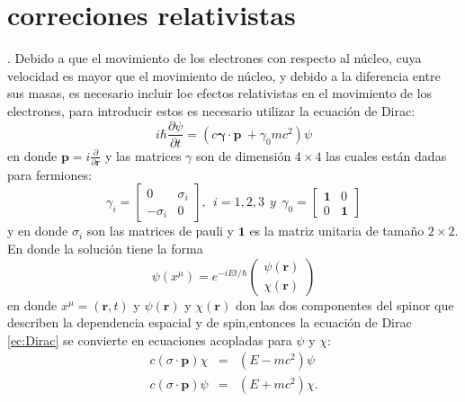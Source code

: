 \documentclass[12pt,a4paper, oneside]{book}
\begin{document}
   \section{correciones relativistas} \label{sec:corrRel}.
   Debido a que el movimiento de los electrones con respecto al n\'ucleo, cuya velocidad es mayor que el movimiento  de n\'ucleo, y debido a la diferencia entre sus masas, es necesario incluir loe efectos relativistas en el movimiento de los electrones, para introducir estos  es necesario utilizar la ecuaci\'on de Dirac:
   \begin{equation}
   i \hbar \frac{\partial \psi}{\partial t} = (c \pmb{\gamma}\cdot \pmb{p} ~+ \gamma_0 m  c^2  ) \psi \label{ec:Dirac}
   \end{equation}
   en donde $\pmb{p } = i \frac{\partial}{\partial \pmb{r}}$ y las matrices $\gamma$ son de dimensi\'on $4 \times 4$ las cuales est\'an dadas para fermiones:
   \begin{equation}
   \gamma_i = 
   \begin{bmatrix}
   0         & \sigma_i \\
   -\sigma_i &    0
   \end{bmatrix},~~i=1,2,3~~y~~
   \gamma_0 =
   \begin{bmatrix}
   \pmb{1}    &   0 \\
      0       &  \pmb{1}
   \end{bmatrix} \label{ec:GammaMatr}
   \end{equation}
    y en donde $\sigma_i$ son las matrices de pauli y $\pmb{1}$ es la matriz unitaria de tama\~no $2 \times 2$.
    \newline
    En donde la soluci\'on tiene la forma
    \begin{equation}
    \psi(x^{\mu}) = e^{-i E t /\hbar} 
    \begin{pmatrix}
    \psi(\pmb{r}) \\
    \chi(\pmb{r})
    \end{pmatrix} \label{ec:solDir}
    \end{equation}
    en donde $x^{\mu} = (\pmb{r},t)$ y $\psi (\pmb{r})$ y $\chi (\pmb{r})$ don las dos componentes del spinor que describen la dependencia espacial y de spin,entonces la ecuaci\'on de Dirac \ref{ec:Dirac} se convierte en ecuaciones acopladas para $\psi$ y  $\chi$:
    \begin{eqnarray}
    c (\sigma \cdot \pmb{p}) \chi &=& (E-m c^2) \psi \nonumber \\
    c (\sigma \cdot \pmb{p}) \psi &=& (E+m c^2) \chi. \label{ec:sistEqDirac}
    \end{eqnarray}
\end{document}
